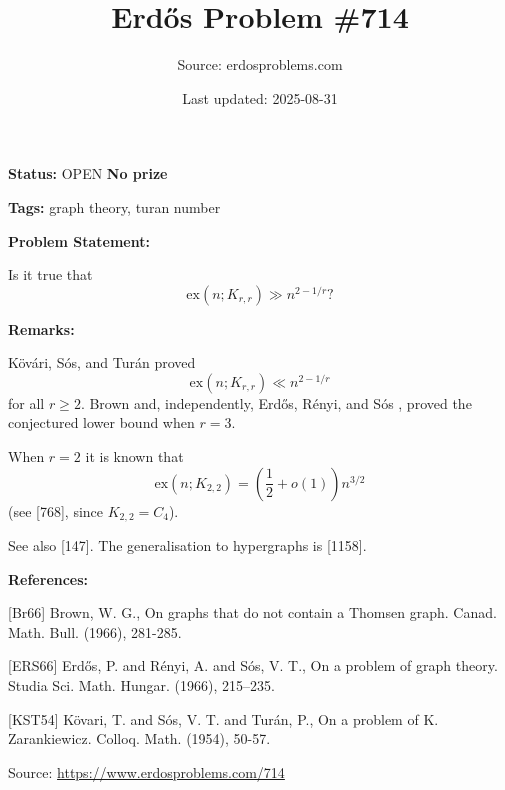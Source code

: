 \documentclass{article}
\title{Erd\H{o}s Problem \#714}
\date{Last updated: 2025-08-31}
\author{Source: erdosproblems.com}
\begin{document}
\maketitle

\noindent\textbf{Status:} OPEN \quad \textbf{No prize}

\noindent\textbf{Tags:} graph theory, turan number

\medskip
\noindent\textbf{Problem Statement:}

Is it true that\[\mathrm{ex}(n; K_{r,r}) \gg n^{2-1/r}?\]

\bigskip
\noindent\textbf{Remarks:}

K\"{o}v\'{a}ri, S\'{o}s, and Tur\'{a}n \cite{KST54} proved\[\mathrm{ex}(n; K_{r,r}) \ll n^{2-1/r}\]for all $r\geq 2$. Brown \cite{Br66} and, independently, Erd\H{o}s, R\'{e}nyi, and S\'{o}s \cite{ERS66}, proved the conjectured lower bound when $r=3$.

When $r=2$ it is known that\[\mathrm{ex}(n;K_{2,2})=\left(\frac{1}{2}+o(1)\right)n^{3/2}\](see [768], since $K_{2,2}=C_4$).

See also [147]. The generalisation to hypergraphs is [1158].

\bigskip
\noindent\textbf{References:}

[Br66] Brown, W. G., On graphs that do not contain a Thomsen graph. Canad. Math. Bull. (1966), 281-285.
 
 [ERS66] Erd\H{o}s, P. and R\'{e}nyi, A. and S\'os, V. T., On a problem of graph theory. Studia Sci. Math. Hungar. (1966), 215--235.
 
 [KST54] K\"{o}vari, T. and S\'{o}s, V. T. and Tur\'{a}n, P., On a problem of K. Zarankiewicz. Colloq. Math. (1954), 50-57.

\bigskip
\noindent\small{Source: \url{https://www.erdosproblems.com/714}}
\end{document}
